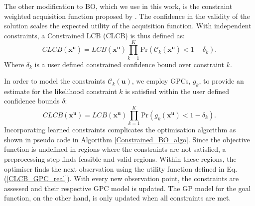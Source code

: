 \documentclass[shortAfour,sageh,times]{sagej_no_sage}
\begin{document}
The other modification to BO, which we use in this work, is the constraint weighted acquisition function proposed by \citet{Gelbart2014}. The confidence in the validity of the solution scales the expected utility of the acquisition function. With independent constraints, a Constrained LCB (CLCB) is thus defined as:  
\begin{equation}\label{CLCB_real}
	CLCB(\boldsymbol{x}^{\boldsymbol{u}}) = LCB(\boldsymbol{x}^{\boldsymbol{u}})\prod_{k=1}^{K} \mathrm{Pr}(\mathcal{C}_k(\boldsymbol{x}^{\boldsymbol{u}}) <  1-\delta_k).
\end{equation}
Where $\delta_k$ is a user defined constrained confidence bound over constraint $k$.

In order to model the constraints $\mathcal{C}_k(\boldsymbol{u})$, we employ GPCs, $g_k$, to provide an estimate for the likelihood constraint $k$ is satisfied within the user defined confidence bounds $\delta$:
\begin{equation}\label{CLCB_GPC_real}
	CLCB(\boldsymbol{x}^{\boldsymbol{u}}) = LCB(\boldsymbol{x}^{\boldsymbol{u}})\prod_{k=1}^{K} \mathrm{Pr}(g_k(\boldsymbol{x}^{\boldsymbol{u}}) <  1-\delta_k).
\end{equation}
Incorporating learned constraints complicates the optimisation algorithm as shown in pseudo code in Algorithm \ref{Constrained_BO_algo}. Since the objective function is undefined in regions where the constraints are not satisfied, a preprocessing step finds feasible and valid regions. Within these regions, the optimiser finds the next observation using the utility function defined in Eq. (\ref{CLCB_GPC_real}). With every new observation point, the constraints are assessed and their respective GPC model is updated. The GP model for the goal function, on the other hand, is only updated when all constraints are met.
\end{document}
